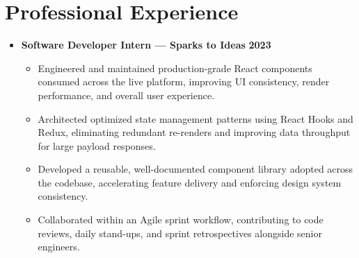 \documentclass[letterpaper,10pt]{article}
\begin{document}
\section*{Professional Experience}
\begin{itemize}
  \item
  \textbf{Software Developer Intern --- Sparks to Ideas} \hfill \textbf{2023}
  \begin{itemize}
    \item Engineered and maintained production-grade React components consumed across the live platform, improving UI consistency, render performance, and overall user experience.
    \item Architected optimized state management patterns using React Hooks and Redux, eliminating redundant re-renders and improving data throughput for large payload responses.
    \item Developed a reusable, well-documented component library adopted across the codebase, accelerating feature delivery and enforcing design system consistency.
    \item Collaborated within an Agile sprint workflow, contributing to code reviews, daily stand-ups, and sprint retrospectives alongside senior engineers.
  \end{itemize}
\end{itemize}

\end{document}
